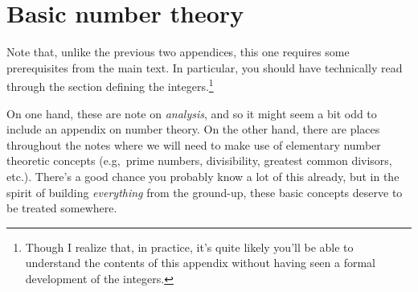 \cleardoublepage
\chapter{Basic number theory}

Note that, unlike the previous two appendices, this one requires some prerequisites from the main text.  In particular, you should have technically read through the section defining the integers.\footnote{Though I realize that, in practice, it's quite likely you'll be able to understand the contents of this appendix without having seen a formal development of the integers.}

On one hand, these are note on \emph{analysis}, and so it might seem a bit odd to include an appendix on number theory.  On the other hand, there are places throughout the notes where we will need to make use of elementary number theoretic concepts (e.g,~prime numbers, divisibility, greatest common divisors, etc.).  There's a good chance you probably know a lot of this already, but in the spirit of building \emph{everything} from the ground-up, these basic concepts deserve to be treated somewhere. 

